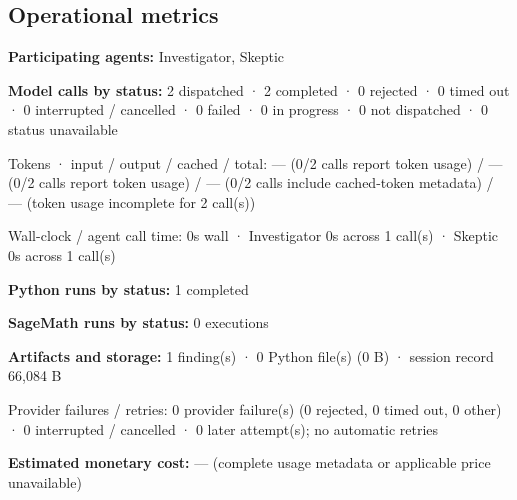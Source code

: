 \documentclass[11pt]{article}
\begin{document}
\subsection{Operational metrics}
\textbf{Participating agents:} Investigator, Skeptic\par
\textbf{Model calls by status:} 2 dispatched · 2 completed · 0 rejected · 0 timed out · 0 interrupted / cancelled · 0 failed · 0 in progress · 0 not dispatched · 0 status unavailable\par
Tokens · input / output / cached / total: — (0/2 calls report token usage) / — (0/2 calls report token usage) / — (0/2 calls include cached-token metadata) / — (token usage incomplete for 2 call(s))\par
Wall-clock / agent call time: 0s wall · Investigator 0s across 1 call(s) · Skeptic 0s across 1 call(s)\par
\textbf{Python runs by status:} 1 completed\par
\textbf{SageMath runs by status:} 0 executions\par
\textbf{Artifacts and storage:} 1 finding(s) · 0 Python file(s) (0 B) · session record 66,084 B\par
Provider failures / retries: 0 provider failure(s) (0 rejected, 0 timed out, 0 other) · 0 interrupted / cancelled · 0 later attempt(s); no automatic retries\par
\textbf{Estimated monetary cost:} — (complete usage metadata or applicable price unavailable)\par
\end{document}
